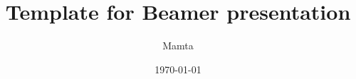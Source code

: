 \documentclass[xcolor=dvipsnames]{beamer}
\title{Template for Beamer presentation}
\author{Mamta }
\institute{SGTB Khalsa College, DU}
\date{\today}
\begin{document}
\begin{frame}
  \titlepage
\vspace*{-10pt}
\end{frame}


% 
% 


\end{document}
